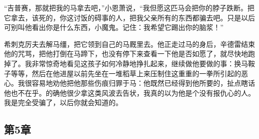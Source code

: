 \par “吉普赛，那就把我的马拿去吧，”小恩萧说，“我但愿这匹马会把你的脖子跌断。把它拿去，该死的，你这讨饭的碍事的人，把我父亲所有的东西都骗去吧。只是以后可别叫他看出你是什么东西，小魔鬼。记住：我希望它踢出你的脑浆！”
\par 希刺克厉夫去解马缰，把它领到自己的马厩里去。他正走过马的身后，辛德雷结束他的咒骂，把他打倒在马蹄下，也没有停下来查看一下他是否如愿了，就尽快地跑掉了。我非常惊奇地看见这孩子如何冷静地挣扎起来，继续做他要做的事：换马鞍子等等，然后在他进屋以前先坐在一堆稻草上来压制住这重重的一拳所引起的恶心。我很容易地劝他把他那些伤痕归罪于马：他既然已经得到他所要的，扯点瞎话他也不在乎。的确他很少拿这类风波去告状，我真的以为他是个没有报仇心的人。我是完全受骗了，以后你就会知道的。


\subsection{第5章}

